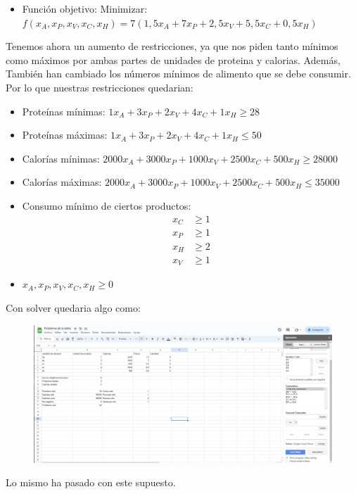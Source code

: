 \documentclass[12pt]{article}
\begin{document}
\begin{itemize}
    \item Función objetivo: Minimizar: \( f(x_A, x_P, x_V, x_C, x_H) = 7(1,5x_A + 7x_P + 2,5x_V + 5,5x_C + 0,5x_H) \)
\end{itemize}
Tenemos ahora un aumento de restricciones, ya que nos piden tanto mínimos como máximos por ambas partes de unidades de proteina y calorias. Además,
También han cambiado los números mínimos de alimento que se debe consumir. Por lo que nuestras restricciones quedarian:
\\
\begin{itemize}
    \item Proteínas mínimas: \( 1x_A + 3x_P + 2x_V + 4x_C + 1x_H \geq 28 \)
    \item Proteínas máximas: \( 1x_A + 3x_P + 2x_V + 4x_C + 1x_H \leq 50 \)
    \item Calorías mínimas: \( 2000x_A + 3000x_P + 1000x_V + 2500x_C + 500x_H \geq 28000 \)
    \item Calorías máximas: \( 2000x_A + 3000x_P + 1000x_V + 2500x_C + 500x_H \leq 35000 \)
    \item Consumo mínimo de ciertos productos:
    \begin{align*}
        x_C & \geq 1 \\
        x_P & \geq 1 \\
        x_H & \geq 2 \\
        x_V & \geq 1
    \end{align*}
    \item \( x_A, x_P, x_V, x_C, x_H \geq 0 \)
\end{itemize}
\clearpage
Con solver quedaria algo como:
\begin{figure}[h!]
    \centering
    \includegraphics[width=.6\textwidth]{supuestoB.PNG}
    \label{fig:my_label}
\end{figure}

Lo mismo ha pasado con este supuesto.
\clearpage
\end{document}
